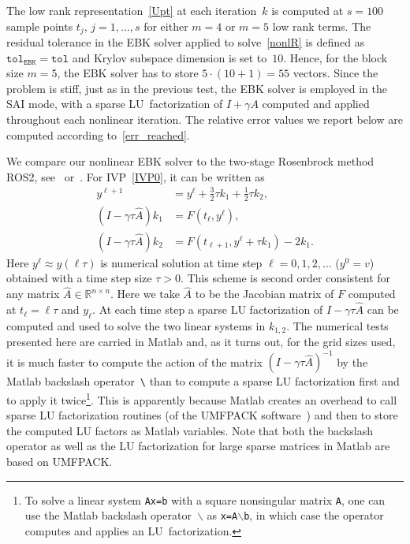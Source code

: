 \documentclass[sn-aps]{sn-jnl}
\theoremstyle{thmstyleone}%
\theoremstyle{thmstyletwo}%
\theoremstyle{thmstylethree}%
\newcommand{\Rr}{\mathbb{R}}
\begin{document}
The low rank representation~\eqref{Upt} at each iteration~$k$ is computed
at $s=100$ sample points $t_j$, $j=1,\dots,s$ for either $m=4$ or $m=5$
low rank terms.
The residual tolerance in the EBK solver applied to solve~\eqref{nonlR} is
defined as $\texttt{tol}_{\mathtt{EBK}}=\texttt{tol}$
and Krylov subspace dimension is set to~$10$.
Hence, for the block size $m=5$, the EBK solver has to store $5\cdot (10+1)=55$
vectors.
Since the problem is stiff, just as in the previous test, the EBK solver is employed in the
SAI mode, with a sparse LU~factorization of $I+\gamma A$ computed and applied
throughout each nonlinear iteration.
The relative error values we report below are computed according to~\eqref{err_reached}.

We compare our nonlinear EBK solver to the two-stage Rosenbrock method
ROS2, see~\cite{ros2} or~\cite[Chapter IV.5]{HundsdorferVerwer:book}.
For IVP~\eqref{IVP0}, it can be written as
\begin{equation}
\label{ros2}
\begin{aligned}
y^{\ell+1} &= y^\ell + \frac32 \tau k_1 + \frac12 \tau k_2, \\
(I-\gamma\tau\widehat{A})k_1 &= F(t_\ell,y^\ell), \\
(I-\gamma\tau\widehat{A})k_2 &= F(t_{\ell+1},y^\ell + \tau k_1) - 2k_1.
\end{aligned}
\end{equation}
Here $y^\ell\approx y(\ell\tau)$ is numerical solution at time step $\ell=0,1,2,\dots$
($y^0=v$)
obtained with a time step size $\tau>0$.
This scheme is second order consistent for any matrix $\widehat{A}\in\Rr^{n\times n}$.
Here we take $\widehat{A}$ to be the Jacobian matrix of $F$ computed at $t_\ell=\ell\tau$
and $y_\ell$.  At each time step a sparse LU factorization of $I-\gamma\tau\widehat{A}$
can be computed and used to solve the two linear systems in $k_{1,2}$.
The numerical tests presented here are carried in Matlab and, as it turns out,
for the grid sizes used,
it is much faster to compute the action of the matrix $(I-\gamma\tau\widehat{A})^{-1}$
by the Matlab backslash operator~\verb|\| than to compute a sparse LU factorization
first and to apply it twice\footnote{To solve a linear system 
\texttt{Ax=b} with a square nonsingular matrix \texttt{A}, 
one can use the Matlab backslash operator~$\mathtt{\backslash}$ as 
\texttt{x=A$\mathtt{\backslash}$b},
in which case the operator computes and applies
an LU~factorization.}.  
This is apparently because Matlab creates 
an overhead to call sparse LU factorization routines 
(of the UMFPACK software~\cite{UMFPACK1,UMFPACK2}) and then to store the computed 
LU factors as Matlab variables. 
Note that both the backslash operator as well as the LU factorization for large
sparse matrices in Matlab are based on UMFPACK.
\end{document}
